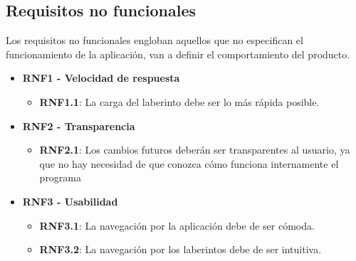 \subsection{Requisitos no funcionales}
Los requisitos no funcionales engloban aquellos que no especifican el funcionamiento de la aplicación, van a definir el comportamiento del producto.
\begin{itemize}
    \item \textbf{RNF1 - Velocidad de respuesta}
		\begin{itemize}
  			\item \textbf{RNF1.1}: La carga del laberinto debe ser lo más rápida posible.
		\end{itemize}
    \item \textbf{RNF2 - Transparencia}
		\begin{itemize}
  			\item \textbf{RNF2.1}: Los cambios futuros deberán ser transparentes al usuario, ya que no hay necesidad de que conozca cómo funciona internamente el programa
		\end{itemize}
    \item \textbf{RNF3 - Usabilidad}
		\begin{itemize}
  			\item \textbf{RNF3.1}: La navegación por la aplicación debe de ser cómoda.
            \item \textbf{RNF3.2}: La navegación por los laberintos debe de ser intuitiva.
		\end{itemize}
\end{itemize}


